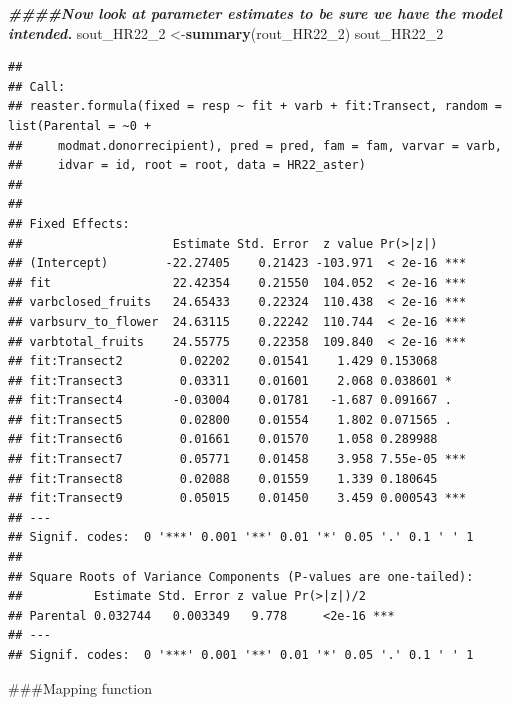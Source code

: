 \documentclass[
]{article}
\newenvironment{Shaded}{\begin{snugshade}}{\end{snugshade}}
\newcommand{\DocumentationTok}[1]{\textcolor[rgb]{0.56,0.35,0.01}{\textbf{\textit{#1}}}}
\newcommand{\FunctionTok}[1]{\textcolor[rgb]{0.13,0.29,0.53}{\textbf{#1}}}
\newcommand{\NormalTok}[1]{#1}
\newcommand{\OtherTok}[1]{\textcolor[rgb]{0.56,0.35,0.01}{#1}}
\begin{document}
\begin{Shaded}
\begin{Highlighting}[]
\DocumentationTok{\#\#\#\#Now look at parameter estimates to be sure we have the model intended.}
\NormalTok{sout\_HR22\_2 }\OtherTok{\textless{}{-}}\FunctionTok{summary}\NormalTok{(rout\_HR22\_2)}
\NormalTok{sout\_HR22\_2}
\end{Highlighting}
\end{Shaded}

\begin{verbatim}
## 
## Call:
## reaster.formula(fixed = resp ~ fit + varb + fit:Transect, random = list(Parental = ~0 + 
##     modmat.donorrecipient), pred = pred, fam = fam, varvar = varb, 
##     idvar = id, root = root, data = HR22_aster)
## 
## 
## Fixed Effects:
##                     Estimate Std. Error  z value Pr(>|z|)    
## (Intercept)        -22.27405    0.21423 -103.971  < 2e-16 ***
## fit                 22.42354    0.21550  104.052  < 2e-16 ***
## varbclosed_fruits   24.65433    0.22324  110.438  < 2e-16 ***
## varbsurv_to_flower  24.63115    0.22242  110.744  < 2e-16 ***
## varbtotal_fruits    24.55775    0.22358  109.840  < 2e-16 ***
## fit:Transect2        0.02202    0.01541    1.429 0.153068    
## fit:Transect3        0.03311    0.01601    2.068 0.038601 *  
## fit:Transect4       -0.03004    0.01781   -1.687 0.091667 .  
## fit:Transect5        0.02800    0.01554    1.802 0.071565 .  
## fit:Transect6        0.01661    0.01570    1.058 0.289988    
## fit:Transect7        0.05771    0.01458    3.958 7.55e-05 ***
## fit:Transect8        0.02088    0.01559    1.339 0.180645    
## fit:Transect9        0.05015    0.01450    3.459 0.000543 ***
## ---
## Signif. codes:  0 '***' 0.001 '**' 0.01 '*' 0.05 '.' 0.1 ' ' 1
## 
## Square Roots of Variance Components (P-values are one-tailed):
##          Estimate Std. Error z value Pr(>|z|)/2    
## Parental 0.032744   0.003349   9.778     <2e-16 ***
## ---
## Signif. codes:  0 '***' 0.001 '**' 0.01 '*' 0.05 '.' 0.1 ' ' 1
\end{verbatim}

\#\#\#Mapping function
\end{document}
